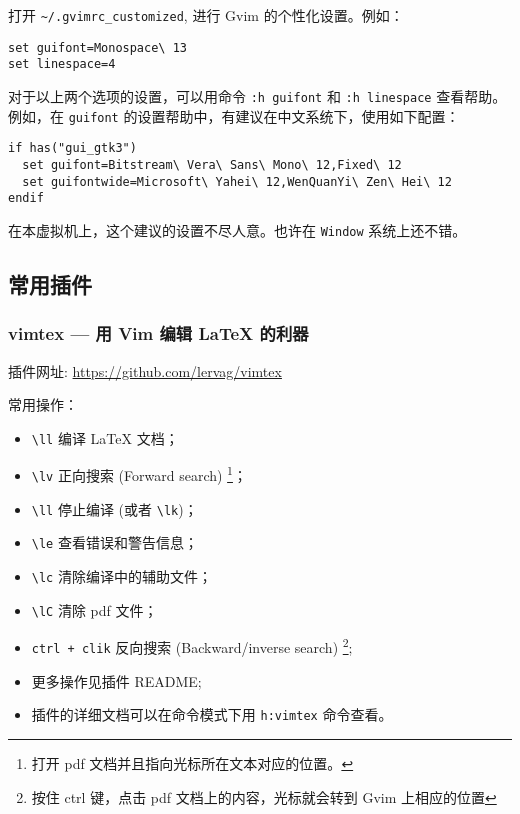 \documentclass[
    11pt,
    cite=authoryear,
    device=normal,
    lang=cn,
    mode=simple,
    result=answer,
    toc=onecol,
]{elegantbook_sierxue}
\begin{document}
打开 \lstinline{~/.gvimrc_customized}, 进行 Gvim 的个性化设置。例如：
\begin{lstlisting}[escapeinside=``]
set guifont=Monospace\ 13
set linespace=4
\end{lstlisting}
对于以上两个选项的设置，可以用命令 \lstinline{:h guifont} 和
\lstinline{:h linespace} 查看帮助。
例如，在 \lstinline{guifont} 的设置帮助中，有建议在中文系统下，使用如下配置：
\begin{lstlisting}[escapeinside=``]
if has("gui_gtk3")
  set guifont=Bitstream\ Vera\ Sans\ Mono\ 12,Fixed\ 12
  set guifontwide=Microsoft\ Yahei\ 12,WenQuanYi\ Zen\ Hei\ 12
endif
\end{lstlisting}
\begin{note}\label{note:guifont}
    在本虚拟机上，这个建议的设置不尽人意。也许在 \lstinline{Window}
    系统上还不错。
\end{note}

\subsection{常用插件}%
\label{sub:vim-plugins}

\subsubsection{vimtex --- 用 Vim 编辑 \LaTeX{} 的利器}%
\label{ssub:vim-plugin-vimtex}

插件网址:
\href{https://github.com/lervag/vimtex}{https://github.com/lervag/vimtex}

常用操作：
\begin{itemize}
    \item \lstinline{\ll} 编译 \LaTeX{} 文档；
    \item \lstinline{\lv} 正向搜索 (Forward search)
        \footnote{打开 pdf 文档并且指向光标所在文本对应的位置。}；
    \item \lstinline{\ll} 停止编译 (或者 \lstinline{\lk})；
    \item \lstinline{\le} 查看错误和警告信息；
    \item \lstinline{\lc} 清除编译中的辅助文件；
    \item \lstinline{\lC} 清除 pdf 文件；
    \item \lstinline{ctrl + clik} 反向搜索 (Backward/inverse search)
        \footnote{按住 ctrl 键，点击 pdf 文档上的内容，光标就会转到 Gvim
        上相应的位置};
    \item 更多操作见插件 README;
    \item 插件的详细文档可以在命令模式下用 \lstinline{h:vimtex} 命令查看。
\end{itemize}
\end{document}
